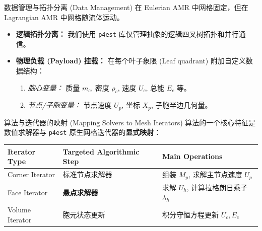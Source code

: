 \documentclass{beamer}
\begin{document}
	\begin{frame}{数据管理与拓扑分离 (Data Management)}
		在 Eulerian AMR 中网格固定，但在 Lagrangian AMR 中网格随流体运动。
		\vspace{0.2cm}
		\begin{itemize}
			\item \textbf{逻辑拓扑分离：} 我们使用 \texttt{p4est} 库仅管理抽象的逻辑四叉树拓扑和并行通信。
			\item \textbf{物理负载 (Payload) 挂载：} 在每个叶子象限 (Leaf quadrant) 附加自定义数据结构：
			\begin{enumerate}
				\item \textit{胞心变量：} 质量 $m_c$, 密度 $\rho_c$, 速度 $U_c$, 总能 $E_c$ 等。
				\item \textit{节点/子胞变量：} 节点速度 $U_p$, 坐标 $X_p$, 子胞半边几何量。
			\end{enumerate}
		\end{itemize}
	\end{frame}
	
	\begin{frame}{算法与迭代器的映射 (Mapping Solvers to Mesh Iterators)}
		算法的一个核心特征是数值求解器与 \texttt{p4est} 原生网格迭代器的\textbf{显式映射}：
		
		\begin{table}[htbp]
			\centering\small
			\begin{tabular}{lll}
				\toprule
				\textbf{Iterator Type} & \textbf{Targeted Algorithmic Step} & \textbf{Main Operations} \\
				\midrule
				\textcolor{deepblue}{Corner Iterator} & 标准节点求解器 & 组装 $M_p$, 求解主节点速度 $U_p$ \\
				\textcolor{deepblue}{Face Iterator} & \textbf{悬点求解器} & 求解 $U_h$, 计算拉格朗日乘子 $\lambda_h$ \\
				\textcolor{deepblue}{Volume Iterator} & 胞元状态更新 & 积分守恒方程更新 $U_c, E_c$ \\
				\bottomrule
			\end{tabular}
		\end{table}
	\end{frame}
	
\end{document}
